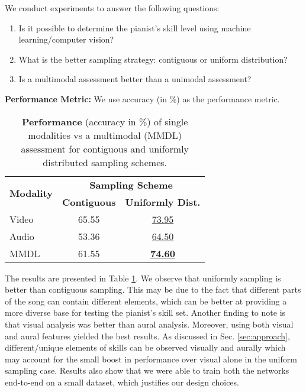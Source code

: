 \documentclass{article}
\begin{document}
We conduct experiments to answer the following questions: 
\begin{enumerate}
    \item Is it possible to determine the pianist's skill level using machine learning/computer vision? 
    \item What is the better sampling strategy: contiguous or uniform distribution? 
    \item Is a multimodal assessment better than a unimodal assessment? 
\end{enumerate}
\noindent\textbf{Performance Metric:} We use accuracy (in \%) as the performance metric. \\
\begin{table}[]
\small
\centering
\begin{tabular}{@{}lcc@{}}
\toprule
\multirow{2}{*}{\textbf{Modality}} & \multicolumn{2}{c}{\textbf{Sampling Scheme}}   \\ \cmidrule(l){2-3} 
                                   & \textbf{Contiguous} & \textbf{Uniformly Dist.} \\ \cmidrule(r){1-1} \cmidrule(l){2-2} \cmidrule(l){3-3} 
Video                              & 65.55                 & \underline{73.95}                        \\
Audio                              & 53.36                 & \underline{64.50}                        \\
\textsc{MMDL}                               & 61.55                 & \textbf{\underline{74.60}}                        \\ \bottomrule
\end{tabular}
\caption{\textbf{Performance} (accuracy in \%) of single modalities vs a multimodal (\textsc{MMDL}) assessment for contiguous and uniformly distributed sampling schemes.}
\label{tab:res_smdl_vs_mmdl}
\end{table} 
The results are presented in Table \ref{tab:res_smdl_vs_mmdl}. We observe that uniformly sampling is better than contiguous sampling. This may be due to the fact that different parts of the song can contain different elements, which can be better at providing a more diverse base for testing the pianist's skill set. Another finding to note is that visual analysis was better than aural analysis. Moreover, using both visual and aural features yielded the best results. As discussed in Sec. \ref{sec:approach}, different/unique elements of skills can be observed visually and aurally which may account for the small boost in performance over visual alone in the uniform sampling case. Results also show that we were able to train both the networks end-to-end on a small dataset, which justifies our design choices.
\end{document}
